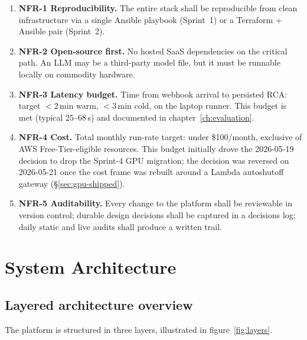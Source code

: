 \documentclass[11pt,a4paper,oneside]{report}
\begin{document}
\begin{enumerate}
  \item \textbf{NFR-1 Reproducibility.}  The entire stack shall be
        reproducible from clean infrastructure via a single Ansible
        playbook (Sprint~1) or a Terraform + Ansible pair (Sprint~2).
  \item \textbf{NFR-2 Open-source first.}  No hosted SaaS dependencies
        on the critical path.  An LLM may be a third-party model file,
        but it must be runnable locally on commodity hardware.
  \item \textbf{NFR-3 Latency budget.}  Time from webhook arrival to
        persisted RCA: target $<2$\,min warm, $<3$\,min cold, on the
        laptop runner.  This budget is met (typical 25--68\,s) and
        documented in chapter~\ref{ch:evaluation}.
  \item \textbf{NFR-4 Cost.}  Total monthly run-rate target: under
        \$100/month, exclusive of AWS Free-Tier-eligible resources.
        This budget initially drove the 2026-05-19 decision to drop
        the Sprint-4 GPU migration; the decision was reversed on
        2026-05-21 once the cost frame was rebuilt around a Lambda
        autoshutoff gateway (\S\ref{sec:gpu-shipped}).
  \item \textbf{NFR-5 Auditability.}  Every change to the platform
        shall be reviewable in version control; durable design
        decisions shall be captured in a decisions log; daily
        static and live audits shall produce a written trail.
\end{enumerate}

\chapter{System Architecture}
\label{ch:architecture}

\section{Layered architecture overview}

The platform is structured in three layers, illustrated in
figure~\ref{fig:layers}.
\end{document}
